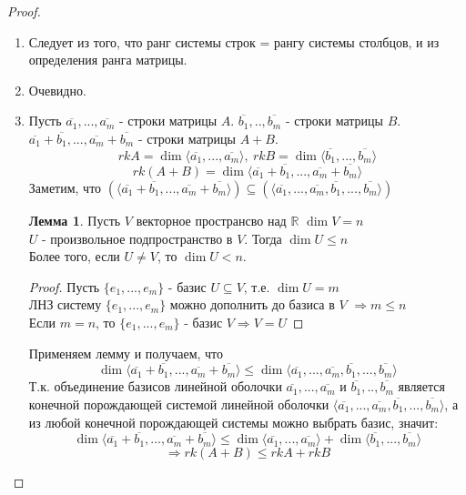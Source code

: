 \documentclass[a4paper, 12pt]{article}
\newcommand{\R}{\mathbb R}
\newcommand\tab[1][.5cm]{\hspace*{#1}}
\theoremstyle{definition}
\newtheorem*{lemma}{Лемма}
\begin{document}
  \begin{proof} \tab
    \begin{enumerate} 
      \item Следует из того, что ранг системы строк = рангу системы столбцов, и из определения ранга матрицы.
      \item Очевидно. 
      \item Пусть $\overline{a_1},...,\overline{a_m}$ - строки матрицы $A$. $\overline{b_1},..,\overline{b_m}$  - строки матрицы $B$. \\
      $\overline{a_1} + \overline{b_1} ,..., \overline{a_m} + \overline{b_m}$ - строки матрицы $A+B$. 
      $$rkA = \dim \langle \overline{a_1},...,\overline{a_m} \rangle, \ rkB = \dim \langle \overline{b_1},...,\overline{b_m} \rangle$$   
      $$rk(A+B) = \dim \langle \overline{a_1} + \overline{b_1} ,..., \overline{a_m} + \overline{b_m} \rangle$$ 
      Заметим, что $(\langle \overline{a_1} + \overline{b_1} ,..., \overline{a_m} + \overline{b_m} \rangle) \subseteq (\langle \overline{a_1},...,\overline{a_m}, \overline{b_1},...,\overline{b_m} \rangle)$   
      \begin{lemma}
        Пусть $V$ векторное пространсво над $\R$ $\dim V = n$  \\
        $U$ -  произвольное подпространство в $V$. Тогда $\dim U \leq n$ \\
        Более того, если $U \neq V$, то $\dim U<n$.
      \end{lemma} 
      \begin{proof} 
        Пусть $\{e_1,...,e_m\}$ - базис $U \subseteq V$, т.е. $\dim U = m$ \\
        ЛНЗ систему $\{e_1,...,e_m\}$ можно дополнить до базиса в $V$ $\Longrightarrow m\leq n$  \\
        Если $m = n$, то $\{e_1,...,e_m\}$ - базис $V \Longrightarrow V=U$
      \end{proof} 
      Применяем лемму и получаем, что 
      $$\dim\langle \overline{a_1} + \overline{b_1} ,..., \overline{a_m} + \overline{b_m} \rangle \leq \dim\langle \overline{a_1},...,\overline{a_m}, \overline{b_1},...,\overline{b_m} \rangle$$ 
      Т.к. объединение базисов линейной оболочки $\overline{a_1},...,\overline{a_m}$ и $\overline{b_1},..,\overline{b_m}$ является конечной порождающей системой линейной оболочки $\langle \overline{a_1},...,\overline{a_m}, \overline{b_1},...,\overline{b_m} \rangle$, а из любой конечной порождающей системы можно выбрать базис, значит: $$\dim\langle \overline{a_1} + \overline{b_1} ,..., \overline{a_m} + \overline{b_m} \rangle \leq \dim\langle \overline{a_1},...,\overline{a_m} \rangle + \dim\langle \overline{b_1},...,\overline{b_m} \rangle$$ $$\Longrightarrow  rk(A+B) \leq rkA + rkB$$

\end{enumerate}
\end{proof}
\end{document}
